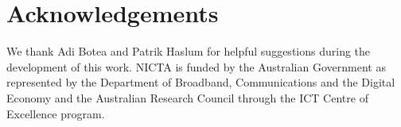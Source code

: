 \section{Acknowledgements}
We thank Adi Botea and Patrik Haslum for helpful suggestions during the development
of this work. NICTA is funded by the Australian Government as represented by the Department of 
Broadband, Communications and the Digital Economy and the Australian Research 
Council through the ICT Centre of Excellence program.

